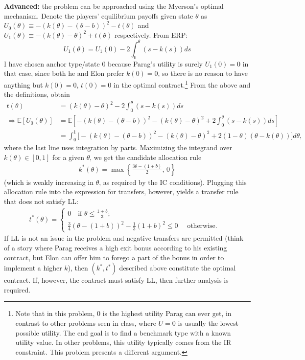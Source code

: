 \documentclass[a4paper]{article}
\begin{document}
\begin{enumerate}[label={(\alph{enumi})}]
	\textbf{Advanced:} the problem can be approached using the Myerson's optimal mechanism. Denote the players' equilibrium payoffs given state $\theta$ as $U_0(\theta) \equiv -(k(\theta)-(\theta-b))^2 - t(\theta)$ and $U_1(\theta) \equiv -(k(\theta)-\theta)^2 + t(\theta)$ respectively. From ERP: 
	\begin{equation}
		U_1(\theta) = U_1(0) - 2\int_0^\theta (s-k(s))ds
	\end{equation}
	I have chosen anchor type/state $0$ because Parag's utility is surely $U_1(0)=0$ in that case, since both he and Elon prefer $k(0)=0$, so there is no reason to have anything but $k(0)=0,\, t(0)=0$ in the optimal contract.\footnote{Note that in this problem, $0$ is the highest utility Parag can ever get, in contrast to other problems seen in class, where $U=0$ is usually the lowest possible utility. The end goal is to find a benchmark type with a known utility value. In other problems, this utility typically comes from the IR constraint. This problem presents a different argument.}
	From the above and the definitions, obtain
	\begin{align*}
		t(\theta) &= (k(\theta)-\theta)^2 - 2\int_0^\theta (s-k(s))ds
		\\ \Rightarrow
		\mathbb{E}[U_0(\theta)] &= \mathbb{E} \left[ -(k(\theta)-(\theta-b))^2 - (k(\theta)-\theta)^2 + 2\int_0^\theta (s-k(s))ds \right]
		\\
		&= \int_0^1 \Big[ -(k(\theta)-(\theta-b))^2 - (k(\theta)-\theta)^2 + 2(1-\theta)(\theta-k(\theta)) \Big] d\theta,
	\end{align*}
	where the last line uses integration by parts. Maximizing the integrand over $k(\theta) \in [0,1]$ for a given $\theta$, we get the candidate allocation rule
	\begin{align*}
		k^*(\theta) = \max \left\{ \frac{3\theta - (1+b)}{2}, \, 0 \right\}
	\end{align*}
	(which is weakly increasing in $\theta$, as required by the IC conditions). Plugging this allocation rule into the expression for transfers, however, yields a transfer rule that does not satisfy LL:
	\begin{align*}
		t^*(\theta) = \begin{cases}
			0 \quad \text{if } \theta \leq \frac{1+b}{3}; &
			\\
			\frac{3}{4}(\theta - (1+b))^2 - \frac{1}{3}(1+b)^2 \leq 0 \quad \text{ otherwise.}&
		\end{cases}
	\end{align*}
	If LL is not an issue in the problem and negative transfers are permitted (think of a story where Parag receives a high exit bonus according to his existing contract, but Elon can offer him to forego a part of the bonus in order to implement a higher $k$), then $(k^*,t^*)$ described above constitute the optimal contract.
	If, however, the contract must satisfy LL, then further analysis is required.
\end{enumerate}
\fi
\end{document}
